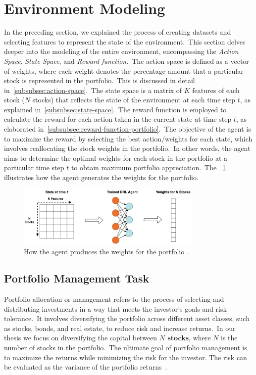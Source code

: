 \documentclass[../xlapes02]{subfiles}
\begin{document}
    \section{Environment Modeling}\label{sec:environment-modeling}
    In the preceding section, we explained the process of creating datasets and selecting features to represent the state of the environment.\ This section delves deeper into the modeling of the entire environment, encompassing the \emph{Action Space}, \emph{State Space}, and \emph{Reward function}.\ The action space is defined as a vector of weights, where each weight denotes the percentage amount that a particular stock is represented in the portfolio.\ This is discussed in detail in~\cref{subsubsec:action-space}.\ The state space is a matrix of $K$ features of each stock ($N$ stocks) that reflects the state of the environment at each time step $t$, as explained in~\cref{subsubsec:state-space}.\ The reward function is employed to calculate the reward for each action taken in the current state at time step $t$, as elaborated in~\cref{subsubsec:reward-function-portfolio}.\ The objective of the agent is to maximize the reward by selecting the best action/weights for each state, which involves reallocating the stock weights in the portfolio.\ In other words, the agent aims to determine the optimal weights for each stock in the portfolio at a particular time step $t$ to obtain maximum portfolio appreciation.\ The ~\cref{fig:state_agent_weights} illustrates how the agent generates the weights for the portfolio.

    \begin{figure}[H]
        \centering
        \includegraphics[width=0.8\textwidth]{./image/state_agent_weightss}
        \caption{How the agent produces the weights for the portfolio~\cite{finrl-portfolio-allocation-2020}.}
        \label{fig:state_agent_weights}
    \end{figure}

    \subsection{Portfolio Management Task}\label{subsec:portfolio-management-task}
    Portfolio allocation or management refers to the process of selecting and distributing investments in a way that meets the investor's goals and risk tolerance.\ It involves diversifying the portfolio across different asset classes, such as stocks, bonds, and real estate, to reduce risk and increase returns.\ In our thesis we focus on diversifying the capital between \textbf{$N$ stocks}, where $N$ is the number of stocks in the portfolio.\ The ultimate goal of portfolio management is to maximize the returns while minimizing the risk for the investor. The risk can be evaluated as the variance of the portfolio returns~\cite{finrl-portfolio-allocation-2020}.
\end{document}
